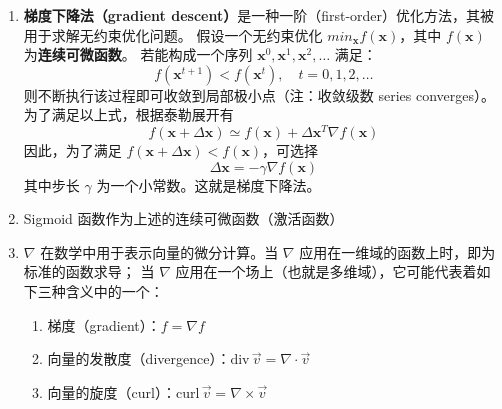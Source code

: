 \documentclass[../studies-ml.tex]{subfiles}
\begin{document}
\begin{enumerate}[I]
  \item \textbf{梯度下降法（gradient descent）}是一种一阶（first-order）优化方法，其被用于求解无约束优化问题。
        假设一个无约束优化 $min_{\pmb{x}} f(\pmb{x})$，其中 $f(\pmb{x})$ 为\textbf{连续可微函数}。
        若能构成一个序列 $\pmb{x}^0,\pmb{x}^1,\pmb{x}^2,\dots$ 满足：
        \begin{equation*}
          f(\pmb{x}^{t+1}) < f(\pmb{x}^{t}),\quad t = 0,1,2,\dots
        \end{equation*}
        则不断执行该过程即可收敛到局部极小点（注：收敛级数 series converges）。为了满足以上式，根据泰勒展开有
        \begin{equation*}
          f(\pmb{x} + \Delta\pmb{x}) \simeq f(\pmb{x}) + \Delta \pmb{x}^T \nabla f(\pmb{x})
        \end{equation*}
        因此，为了满足 $f(\pmb{x} + \Delta\pmb{x}) < f(\pmb{x})$，可选择
        \begin{equation*}
          \Delta \pmb{x} = -\gamma \nabla f(\pmb{x})
        \end{equation*}
        其中步长 $\gamma$ 为一个小常数。这就是梯度下降法。
        \bigbreak

  \item Sigmoid 函数作为上述的连续可微函数（激活函数）
        \begin{center}
        \end{center}

  \item $\nabla$ 在数学中用于表示向量的微分计算。当 $\nabla$ 应用在一维域的函数上时，即为标准的函数求导；
        当 $\nabla$ 应用在一个场上（也就是多维域），它可能代表着如下三种含义中的一个：
        \begin{enumerate}[i]
          \item 梯度（gradient）：$f = \nabla f$
          \item 向量的发散度（divergence）：$\textrm{div}\, \overrightarrow{v} = \nabla \cdot \overrightarrow{v}$
          \item 向量的旋度（curl）：$\textrm{curl}\, \overrightarrow{v} = \nabla \times \overrightarrow{v}$
        \end{enumerate}
\end{enumerate}
\end{document}
